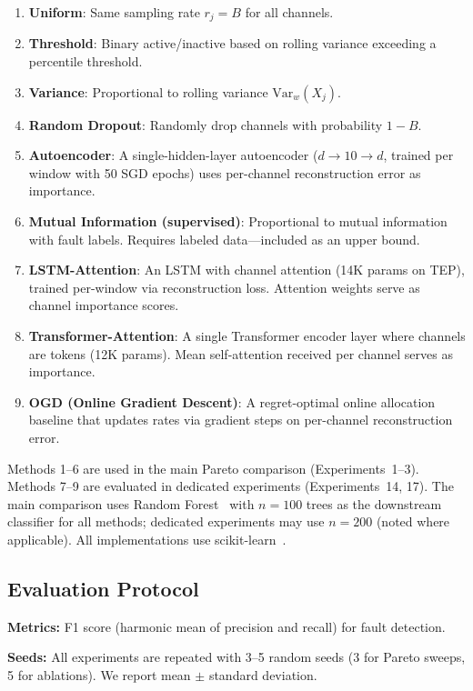 \documentclass[journal]{IEEEtran}
\begin{document}
\begin{enumerate}[leftmargin=*]
\item \textbf{Uniform}: Same sampling rate $r_j = B$ for all channels.
\item \textbf{Threshold}: Binary active/inactive based on rolling variance exceeding a percentile threshold.
\item \textbf{Variance}: Proportional to rolling variance $\text{Var}_w(X_j)$.
\item \textbf{Random Dropout}: Randomly drop channels with probability $1-B$.
\item \textbf{Autoencoder}: A single-hidden-layer autoencoder ($d \to 10 \to d$, trained per window with 50 SGD epochs) uses per-channel reconstruction error as importance.
\item \textbf{Mutual Information (supervised)}: Proportional to mutual information with fault labels. Requires labeled data---included as an upper bound.
\item \textbf{LSTM-Attention}: An LSTM with channel attention (14K params on TEP), trained per-window via reconstruction loss. Attention weights serve as channel importance scores.
\item \textbf{Transformer-Attention}: A single Transformer encoder layer where channels are tokens (12K params). Mean self-attention received per channel serves as importance.
\item \textbf{OGD (Online Gradient Descent)}: A regret-optimal online allocation baseline that updates rates via gradient steps on per-channel reconstruction error.
\end{enumerate}

Methods 1--6 are used in the main Pareto comparison (Experiments~1--3). Methods 7--9 are evaluated in dedicated experiments (Experiments~14, 17). The main comparison uses Random Forest~\cite{breiman2001random} with $n{=}100$ trees as the downstream classifier for all methods; dedicated experiments may use $n{=}200$ (noted where applicable). All implementations use scikit-learn~\cite{pedregosa2011scikit}.

\subsection{Evaluation Protocol}

\textbf{Metrics:} F1 score (harmonic mean of precision and recall) for fault detection.

\textbf{Seeds:} All experiments are repeated with 3--5 random seeds (3 for Pareto sweeps, 5 for ablations). We report mean $\pm$ standard deviation.
\end{document}

